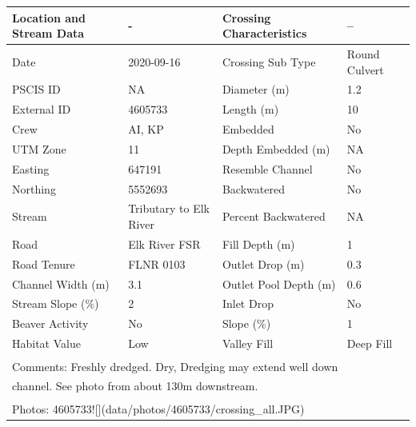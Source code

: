 \documentclass[
]{book}
\begin{document}
\begin{tabular}{llll}
\toprule
Location and Stream Data & - & Crossing Characteristics & --\\
\midrule
Date & 2020-09-16 & Crossing Sub Type & Round Culvert\\
PSCIS ID & NA & Diameter (m) & 1.2\\
External ID & 4605733 & Length (m) & 10\\
Crew & AI, KP & Embedded & No\\
UTM Zone & 11 & Depth Embedded (m) & NA\\
\addlinespace
Easting & 647191 & Resemble Channel & No\\
Northing & 5552693 & Backwatered & No\\
Stream & Tributary to Elk River & Percent Backwatered & NA\\
Road & Elk River FSR & Fill Depth (m) & 1\\
Road Tenure & FLNR 0103 & Outlet Drop (m) & 0.3\\
\addlinespace
Channel Width (m) & 3.1 & Outlet Pool Depth (m) & 0.6\\
Stream Slope (\%) & 2 & Inlet Drop & No\\
Beaver Activity & No & Slope (\%) & 1\\
Habitat Value & Low & Valley Fill & Deep Fill\\
\bottomrule
\multicolumn{4}{l}{\textsuperscript{} Comments: Freshly dredged. Dry, Dredging may extend well down}\\
\multicolumn{4}{l}{channel. See photo from about 130m downstream.}\\
\multicolumn{4}{l}{\textsuperscript{} Photos: 4605733![](data/photos/4605733/crossing\_all.JPG)}\\
\end{tabular}
\end{document}
